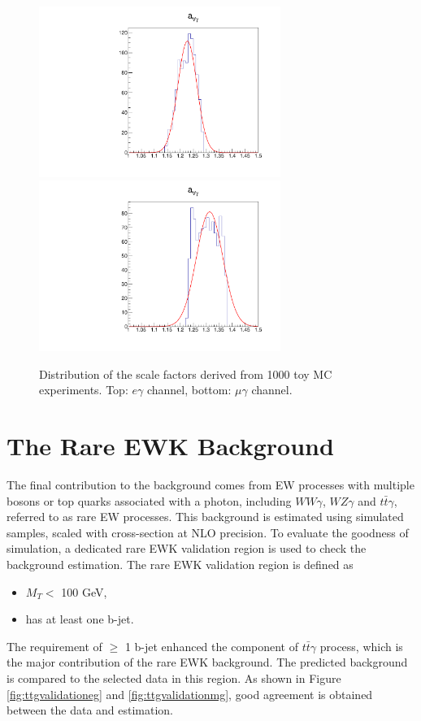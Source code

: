 \documentclass[thesis.tex]{subfiles}
\renewcommand\_{\textunderscore\allowbreak}
\begin{document}
\begin{figure}[hbtp]
  \centering
    \includegraphics[width=0.7\textwidth]{Figures/VGammaScale_eg.pdf} \\
    \includegraphics[width=0.7\textwidth]{Figures/VGammaScale_mg.pdf}
  \caption{Distribution of the scale factors derived from 1000 toy MC experiments. Top: $e\gamma$ channel, bottom: $\mu\gamma$ channel.}
    \label{fig:dphisystematic}
\end{figure}

\section{The Rare EWK Background}
The final contribution to the background comes from EW processes with multiple bosons or top quarks associated with a photon, including $WW\gamma$, $WZ\gamma$ and $t\bar{t}\gamma$, referred to as rare EW processes. 
This background is estimated using simulated samples, scaled with cross-section at NLO precision.
To evaluate the goodness of simulation, a dedicated rare EWK validation region is used to check the background estimation.
The rare EWK validation region is defined as
	\begin{itemize}
		\item $M_T <$ 100 GeV,
		\item has at least one b-jet.
	\end{itemize}
The requirement of $\ge$ 1 b-jet enhanced the component of $t\bar{t}\gamma$ process, which is the major contribution of the rare EWK background.
The predicted background is compared to the selected data in this region.
As shown in Figure \ref{fig:ttgvalidationeg} and \ref{fig:ttgvalidationmg}, good agreement is obtained between the data and estimation.
\end{document}
